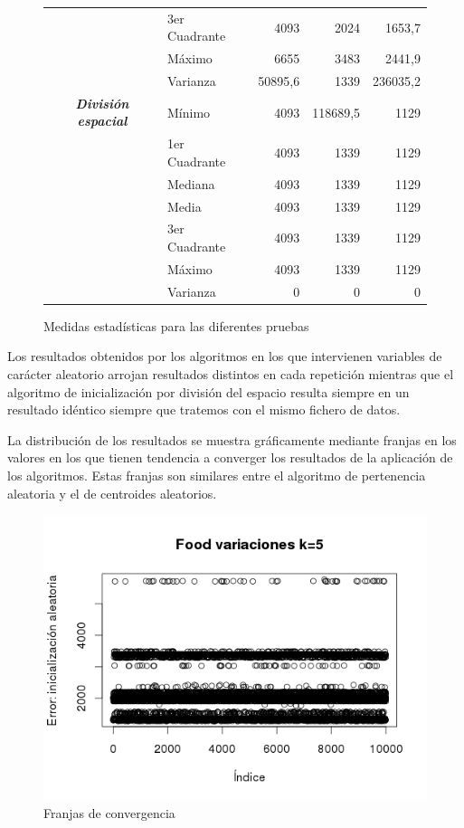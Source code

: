 \documentclass[a4paper]{report}
\begin{document}
\begin{figure}[htbp]
\begin{center}
\begin{tabular}{|c|l|r|r|r|}
	\multicolumn{ 1}{|c|}{} & 3er Cuadrante & 4093 & 2024 & 1653,7 \\ \cline{ 2- 5}
	\multicolumn{ 1}{|c|}{} & Máximo & 6655 & 3483 & 2441,9 \\ \cline{ 2- 5}
	\multicolumn{ 1}{|c|}{} & Varianza & 50895,6 & 1339 & 236035,2 \\ \hline
	\multicolumn{ 1}{|c|}{\textbf{\textit{División espacial}}} & Mínimo & 4093 & 118689,5 & 1129 \\ \cline{ 2- 5}
	\multicolumn{ 1}{|c|}{} & 1er Cuadrante & 4093 & 1339 & 1129 \\ \cline{ 2- 5}
	\multicolumn{ 1}{|c|}{} & Mediana & 4093 & 1339 & 1129 \\ \cline{ 2- 5}
	\multicolumn{ 1}{|c|}{} & Media & 4093 & 1339 & 1129 \\ \cline{ 2- 5}
	\multicolumn{ 1}{|c|}{} & 3er Cuadrante & 4093 & 1339 & 1129 \\ \cline{ 2- 5}
	\multicolumn{ 1}{|c|}{} & Máximo & 4093 & 1339 & 1129 \\ \cline{ 2- 5}
	\multicolumn{ 1}{|c|}{} & Varianza & 0 & 0 & 0 \\ \hline
	\end{tabular}
	\end{center}
	\caption{Medidas estadísticas para las diferentes pruebas}
	\label{tablavar}
	\end{figure}
	
	
	
	Los resultados obtenidos por los algoritmos en los que intervienen variables de carácter aleatorio arrojan resultados distintos en cada repetición mientras que el algoritmo de inicialización por división del espacio resulta siempre en un resultado idéntico siempre que tratemos con el mismo fichero de datos.
	
	La distribución de los resultados se muestra gráficamente mediante franjas en los valores en los que tienen tendencia a converger los resultados de la aplicación de los algoritmos. Estas franjas son similares entre el algoritmo de pertenencia aleatoria y el de centroides aleatorios.
	
	\begin{figure}
		\centering
		\includegraphics[width=0.7\linewidth]{Figuras/Franjas}
		\caption{Franjas de convergencia}
		\label{fig:Franjas}
	\end{figure}
\end{document}
